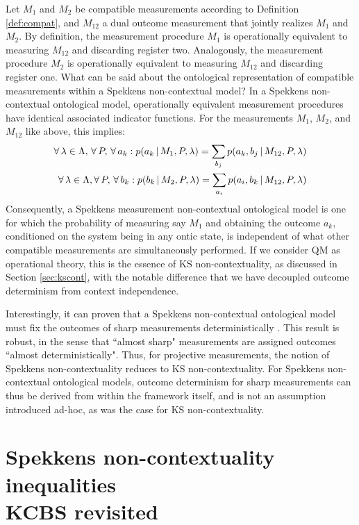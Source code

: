 Let $M_{1}$ and $M_{2}$ be compatible measurements according to Definition \ref{def:compat}, and $M_{12}$ a dual outcome measurement that jointly realizes $M_1$ and $M_2$. By definition, the measurement procedure $M_{1}$ is operationally equivalent to measuring $M_{12}$ and discarding register two. Analogously, the measurement procedure $M_{2}$ is operationally equivalent to measuring $M_{12}$ and discarding register one. What can be said about the ontological representation of compatible measurements within a Spekkens non-contextual model? In a Spekkens non-contextual ontological model, operationally equivalent measurement procedures have identical associated indicator functions. For the measurements $M_{1}$, $M_{2}$, and $M_{12}$ like above, this implies:
\begin{align*}
\forall\thinspace\lambda\in\Lambda,\thinspace\forall \thinspace P,\thinspace\forall\thinspace a_{k}:p(a_{k}\thinspace\vert\thinspace M_{1},P,\lambda)=\sum_{b_{j}}p(a_{k},b_{j}\thinspace\vert\thinspace M_{12},P,\lambda)\\
\forall\thinspace\lambda\in\Lambda,\forall\thinspace P,\thinspace\forall\thinspace b_{k}:p(b_{k}\thinspace\vert\thinspace M_{2},P,\lambda)=\sum_{a_{i}}p(a_{i},b_{k}\thinspace\vert\thinspace M_{12},P,\lambda)
\end{align*}
Consequently, a Spekkens measurement non-contextual ontological model is one for which the probability of measuring say $M_{1}$ and obtaining the outcome $a_{k}$, conditioned on the system being in any ontic state, is independent of what other compatible measurements are simultaneously performed. If we consider QM as operational theory, this is the essence of KS non-contextuality, as discussed in Section \ref{sec:kscont}, with the notable difference that we have decoupled outcome determinism from context independence.

Interestingly, it can proven that a Spekkens non-contextual ontological model must fix the outcomes of sharp measurements deterministically \cite{Spekkens2014}. This result is robust, in the sense that ``almost sharp" measurements are assigned outcomes ``almost deterministically". Thus, for projective measurements, the notion of Spekkens non-contextuality reduces to KS non-contextuality. For Spekkens non-contextual ontological models, outcome determinism for sharp measurements can thus be derived from within the framework itself, and is not an assumption introduced ad-hoc, as was the case for KS non-contextuality.

\section[Spekkens non-contextuality inequalities \\ KCBS revisited]{Spekkens non-contextuality inequalities \\ \large{KCBS revisited}}
\label{sec:spekkensineq}
